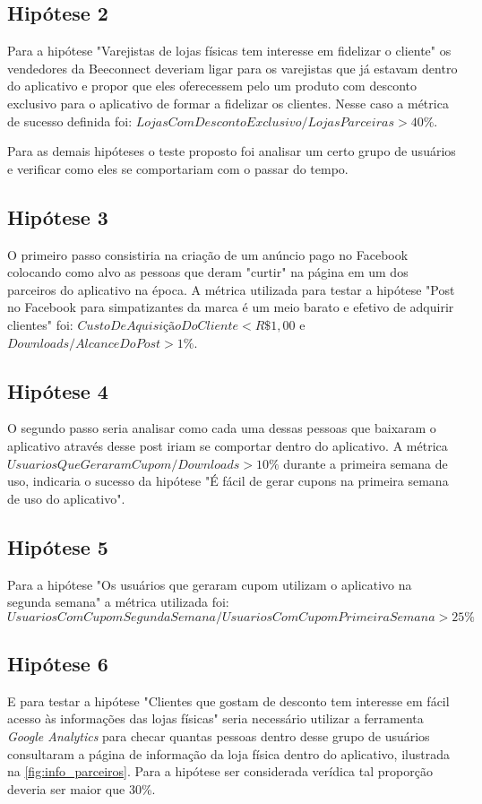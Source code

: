 \subsection{Hipótese 2}
\label{cha:hip_2}
Para a hipótese "Varejistas de lojas físicas tem interesse em fidelizar o cliente" os vendedores da Beeconnect deveriam ligar para os varejistas que já estavam dentro do aplicativo e propor que eles oferecessem pelo um produto com desconto exclusivo para o aplicativo de formar a fidelizar os clientes. Nesse caso a métrica de sucesso definida foi: $LojasComDescontoExclusivo/Lojas Parceiras > 40\%$.

Para as demais hipóteses o teste proposto foi analisar um certo grupo de usuários e verificar como eles se comportariam com o passar do tempo. 

\subsection{Hipótese 3}
\label{cha:hip_3}
O primeiro passo consistiria na criação de um anúncio pago no Facebook colocando como alvo as pessoas que deram "curtir" na página em um dos parceiros do aplicativo na época. A métrica utilizada para testar a hipótese "Post no Facebook para simpatizantes da marca é um meio barato e efetivo de adquirir clientes" foi: $CustoDeAquisiçãoDoCliente < R\$1,00$ e $Downloads/Alcance Do Post > 1\%$.

\subsection{Hipótese 4}
\label{cha:hip_4}
O segundo passo seria analisar como cada uma dessas pessoas que baixaram o aplicativo através desse post iriam se comportar dentro do aplicativo. A métrica $UsuariosQueGeraramCupom/Downloads > 10\%$ durante a primeira semana de uso, indicaria o sucesso da hipótese "É fácil de gerar cupons na primeira semana de uso do aplicativo". 

\subsection{Hipótese 5}
\label{cha:hip_5}
Para a hipótese "Os usuários que geraram cupom utilizam o aplicativo na segunda semana" a métrica utilizada foi:
\begin{equation}
UsuariosComCupomSegundaSemana/UsuariosComCupomPrimeiraSemana > 25\%
\end{equation}

\subsection{Hipótese 6}
\label{cha:hip_6}
E para testar a hipótese "Clientes que gostam de desconto tem interesse em fácil acesso às informações das lojas físicas" seria necessário utilizar a ferramenta \textit{Google Analytics} para checar quantas pessoas dentro desse grupo de usuários consultaram a página de informação da loja física dentro do aplicativo, ilustrada na \autoref{fig:info_parceiros}. Para a hipótese ser considerada verídica tal proporção deveria ser maior que 30\%.

